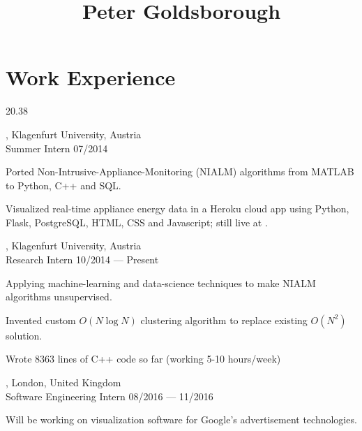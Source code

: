 




\begin{header}
	\title{Peter Goldsborough}
	\separate
	\separate
\end{header}

\section{Work Experience}{2}{0.38}

\begin{entry}
	{, Klagenfurt University, Austria}
	{\\Summer Intern}
	{07/2014}

	\item Ported Non-Intrusive-Appliance-Monitoring (NIALM) algorithms from MATLAB to Python, C++ and SQL.
	\item Visualized real-time appliance energy data in a Heroku cloud app using Python, Flask, PostgreSQL, HTML, CSS and Javascript; still live at .
\end{entry}

\begin{entry}
	{, Klagenfurt University, Austria}
	{\\Research Intern}
	{10/2014 --- Present}
\item Applying machine-learning and data-science techniques to make NIALM
  algorithms unsupervised.
	\item Invented custom $O(N \log N)$ clustering algorithm to replace existing $O(N^2)$ solution.
	\item Wrote 8363 lines of C++ code so far (working 5-10 hours/week)
\end{entry}

\begin{entry}
	{, London, United Kingdom}
	{\\Software Engineering Intern}
	{08/2016 --- 11/2016}
	\item Will be working on visualization software for Google's advertisement technologies.
\end{entry}

